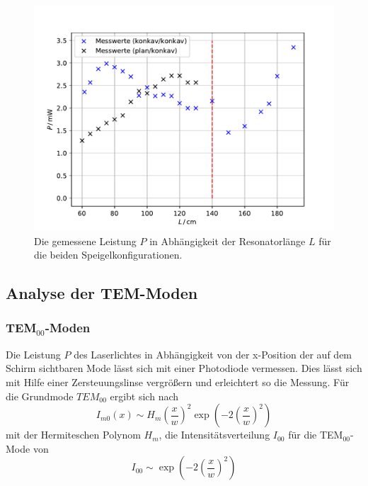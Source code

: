 \begin{figure}[H]
    \center
    \includegraphics[width=\textwidth]{plots/leistung.pdf}
    \caption{Die gemessene Leistung $P$ in Abhängigkeit der Resonatorlänge $L$ für die beiden Speigelkonfigurationen.}
    \label{fig:leistung}
\end{figure}
\subsection{Analyse der TEM-Moden}
\subsubsection{TEM$_{00}$-Moden}
Die Leistung $P$ des Laserlichtes in Abhängigkeit von der x-Position der auf dem Schirm sichtbaren Mode lässt sich mit
einer Photodiode vermessen. Dies lässt sich mit Hilfe einer Zersteuungslinse vergrößern und erleichtert so die Messung.
Für die Grundmode $TEM_{00}$ ergibt sich nach
\begin{equation}
    I_{m0}(x)\sim H_m \left(\frac{x}{w}\right)^2\exp\left(-2\left(\frac{x}{w}\right)^2\right)
\end{equation}
mit der Hermiteschen Polynom $H_m$, die Intensitätsverteilung $I_{00}$ für die TEM$_{00}$-Mode von
\begin{equation}
    I_{00}\sim \exp\left(-2\left(\frac{x}{w}\right)^2\right)
\end{equation}


